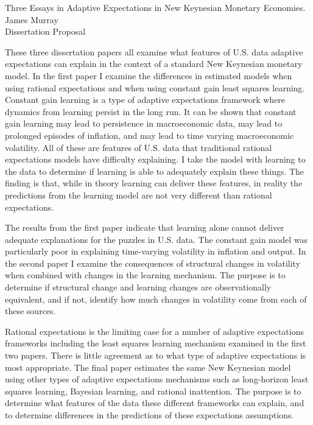 \documentclass[12pt]{article}
\begin{document}
\thispagestyle{empty}
\begin{singlespace}
\noindent Three Essays in Adaptive Expectations in New Keynesian Monetary Economies.\\
James Murray\\
Dissertation Proposal\\
\end{singlespace}

These three dissertation papers all examine what features of U.S. data adaptive expectations can explain in the context of a standard New Keynesian monetary model.  In the first paper I examine the differences in estimated models when using rational expectations and when using constant gain least squares learning.  Constant gain learning is a type of adaptive expectations framework where dynamics from learning persist in the long run.  It can be shown that constant gain learning may lead to persistence in macroeconomic data, may lead to prolonged episodes of inflation, and may lead to time varying macroeconomic volatility.  All of these are features of U.S. data that traditional rational expectations models have difficulty explaining.  I take the model with learning to the data to determine if learning is able to adequately explain these things.  The finding is that, while in theory learning can deliver these features, in reality the predictions from the learning model are not very different than rational expectations.

The results from the first paper indicate that learning alone cannot deliver adequate explanations for the puzzles in U.S. data.  The constant gain model was particularly poor in explaining time-varying volatility in inflation and output.  In the second paper I examine the consequences of structural changes in volatility when combined with changes in the learning mechanism.  The purpose is to determine if structural change and learning changes are observationally equivalent, and if not, identify how much changes in volatility come from each of these sources. 

Rational expectations is the limiting case for a number of adaptive expectations frameworks including the least squares learning mechanism examined in the first two papers.  There is little agreement as to what type of adaptive expectations is most appropriate.  The final paper estimates the same New Keynesian model using other types of adaptive expectations mechanisms such as long-horizon least squares learning, Bayesian learning, and rational inattention.  The purpose is to determine what features of the data these different frameworks can explain, and to determine differences in the predictions of these expectations assumptions.
\end{document}
